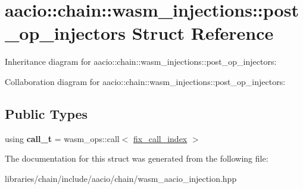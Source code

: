 \hypertarget{structaacio_1_1chain_1_1wasm__injections_1_1post__op__injectors}{}\section{aacio\+:\+:chain\+:\+:wasm\+\_\+injections\+:\+:post\+\_\+op\+\_\+injectors Struct Reference}
\label{structaacio_1_1chain_1_1wasm__injections_1_1post__op__injectors}


Inheritance diagram for aacio\+:\+:chain\+:\+:wasm\+\_\+injections\+:\+:post\+\_\+op\+\_\+injectors\+:


Collaboration diagram for aacio\+:\+:chain\+:\+:wasm\+\_\+injections\+:\+:post\+\_\+op\+\_\+injectors\+:
\subsection*{Public Types}
\begin{DoxyCompactItemize}
\item 
\mbox{\label{structaacio_1_1chain_1_1wasm__injections_1_1post__op__injectors_a726183d0e4ef0b4e2b1d23469d6bfb56}} 
using {\bfseries call\+\_\+t} = wasm\+\_\+ops\+::call$<$ \mbox{\hyperlink{structaacio_1_1chain_1_1wasm__injections_1_1fix__call__index}{fix\+\_\+call\+\_\+index}} $>$
\end{DoxyCompactItemize}


The documentation for this struct was generated from the following file\+:\begin{DoxyCompactItemize}
\item 
libraries/chain/include/aacio/chain/wasm\+\_\+aacio\+\_\+injection.\+hpp\end{DoxyCompactItemize}

